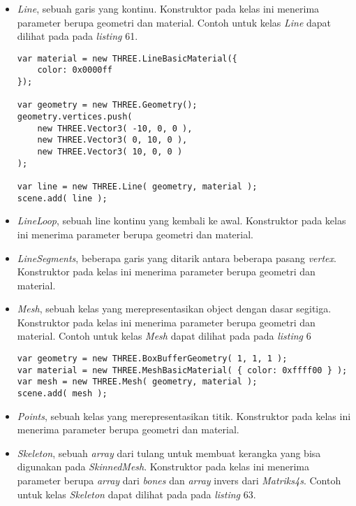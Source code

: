 \documentclass[a4paper,twoside]{article}
\begin{document}
\begin{enumerate}
\begin{itemize}
\begin{itemize}
	\item {\it Line}, sebuah garis yang kontinu. Konstruktor pada kelas ini menerima parameter berupa geometri dan material. Contoh untuk kelas {\it Line} dapat dilihat pada pada {\it listing} 61.
	
\begin{lstlisting}[caption={Contoh penggunaan kelas {\it Line}.},captionpos=b]
var material = new THREE.LineBasicMaterial({
	color: 0x0000ff
});

var geometry = new THREE.Geometry();
geometry.vertices.push(
	new THREE.Vector3( -10, 0, 0 ),
	new THREE.Vector3( 0, 10, 0 ),
	new THREE.Vector3( 10, 0, 0 )
);

var line = new THREE.Line( geometry, material );
scene.add( line );
\end{lstlisting}
	
	\item {\it LineLoop}, sebuah line kontinu yang kembali ke awal. Konstruktor pada kelas ini menerima parameter berupa geometri dan material.
	
	\item {\it LineSegments}, beberapa garis yang ditarik antara beberapa pasang {\it vertex}. Konstruktor pada kelas ini menerima parameter berupa geometri dan material.
	
	\item {\it Mesh}, sebuah kelas yang merepresentasikan object dengan dasar segitiga. Konstruktor pada kelas ini menerima parameter berupa geometri dan material. Contoh untuk kelas {\it Mesh} dapat dilihat pada pada {\it listing} 6
	
\begin{lstlisting}[caption={Contoh penggunaan kelas {\it Mesh}.},captionpos=b]
var geometry = new THREE.BoxBufferGeometry( 1, 1, 1 );
var material = new THREE.MeshBasicMaterial( { color: 0xffff00 } );
var mesh = new THREE.Mesh( geometry, material );
scene.add( mesh );
\end{lstlisting}
	
	\item {\it Points}, sebuah kelas yang merepresentasikan titik. Konstruktor pada kelas ini menerima parameter berupa geometri dan material.
	
	\item {\it Skeleton}, sebuah {\it array} dari tulang untuk membuat kerangka yang bisa digunakan pada {\it SkinnedMesh}. Konstruktor pada kelas ini menerima parameter berupa {\it array} dari {\it bones} dan {\it array} invers dari {\it Matriks4s}. Contoh untuk kelas {\it Skeleton} dapat dilihat pada pada {\it listing} 63.
	

\end{itemize}
\end{itemize}
\end{enumerate}
\end{document}

